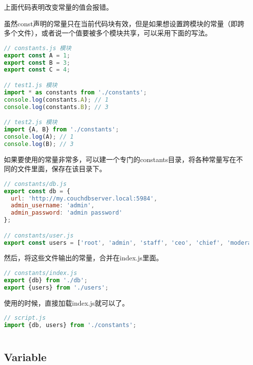 上面代码表明改变常量的值会报错。

虽然const声明的常量只在当前代码块有效，但是如果想设置跨模块的常量（即跨多个文件），或者说一个值要被多个模块共享，可以采用下面的写法。



\begin{lstlisting}[language=JavaScript]
// constants.js 模块
export const A = 1;
export const B = 3;
export const C = 4;

// test1.js 模块
import * as constants from './constants';
console.log(constants.A); // 1
console.log(constants.B); // 3

// test2.js 模块
import {A, B} from './constants';
console.log(A); // 1
console.log(B); // 3
\end{lstlisting}

如果要使用的常量非常多，可以建一个专门的constants目录，将各种常量写在不同的文件里面，保存在该目录下。

\begin{lstlisting}[language=JavaScript]
// constants/db.js
export const db = {
  url: 'http://my.couchdbserver.local:5984',
  admin_username: 'admin',
  admin_password: 'admin password'
};

// constants/user.js
export const users = ['root', 'admin', 'staff', 'ceo', 'chief', 'moderator'];
\end{lstlisting}

然后，将这些文件输出的常量，合并在index.js里面。




\begin{lstlisting}[language=JavaScript]
// constants/index.js
export {db} from './db';
export {users} from './users';
\end{lstlisting}

使用的时候，直接加载index.js就可以了。


\begin{lstlisting}[language=JavaScript]
// script.js
import {db, users} from './constants';
\end{lstlisting}




\begin{lstlisting}[language=JavaScript]

\end{lstlisting}


\subsection{Variable}


